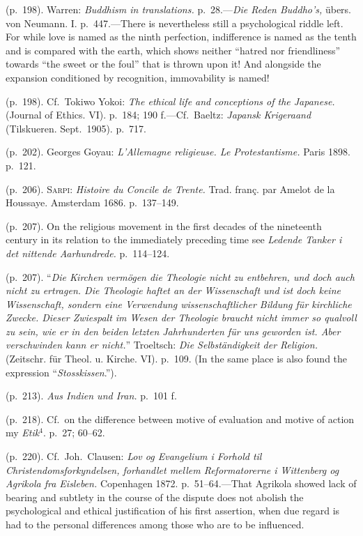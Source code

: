 \documentclass[12pt,a4paper]{book}
\newcommand{\opage}[1]{\marginnote{\footnotesize\textit{[#1]}}}
\begin{document}
 (p.~198). Warren: \emph{Buddhism in translations.} p.~28.---\emph{Die Reden Buddho's,} übers. von
Neumann. I. p.~447.---There is nevertheless still a psychological riddle left. For while love is named
as the ninth perfection, indifference is named as the tenth and is compared with the earth, which shows
neither ``hatred nor friendliness'' towards ``the sweet or the foul'' that is thrown upon it! And
alongside the expansion conditioned by recognition, immovability is named!

 (p.~198). Cf.\ Tokiwo Yokoi: \emph{The ethical life and conceptions of the Japanese.} (Journal of
Ethics. VI). p.~184; 190 f.---Cf.\ Baeltz: \emph{Japansk Krigeraand} (Tilskueren. Sept.\ 1905). p.~717.

 (p.~202). Georges Goyau: \emph{L'Allemagne religieuse. Le Protestantisme.} Paris 1898. p.~121.

 (p.~206). \textsc{Sarpi}: \emph{Histoire du Concile de Trente.} Trad. franç. par Amelot de la Houssaye.
Amsterdam 1686. p.~137--149.

\opage{255}(p.~207). On the religious movement in the first decades of the nineteenth century in its relation to
the immediately preceding time see \emph{Ledende Tanker i det nittende Aarhundrede.} p.~114--124.

 (p.~207). ``\emph{Die Kirchen vermögen die Theologie nicht zu entbehren, und doch auch nicht zu
ertragen. Die Theologie haftet an der Wissenschaft und ist doch keine Wissenschaft, sondern eine
Verwendung wissenschaftlicher Bildung für kirchliche Zwecke. Dieser Zwiespalt im Wesen der Theologie
braucht nicht immer so qualvoll zu sein, wie er in den beiden letzten Jahrhunderten für uns geworden
ist. Aber verschwinden kann er nicht.}'' Troeltsch: \emph{Die Selbständigkeit der Religion.} (Zeitschr.
für Theol. u. Kirche. VI). p.~109. (In the same place is also found the expression
``\emph{Stosskissen}.'').

 (p.~213). \emph{Aus Indien und Iran.} p.~101 f.

 (p.~218). Cf.\ on the difference between motive of evaluation and motive of action my \emph{Etik}$^4$.
p.~27; 60--62.

 (p.~220). Cf.\ Joh.\ Clausen: \emph{Lov og Evangelium i Forhold til Christendomsforkyndelsen,
forhandlet mellem Reformatorerne i Wittenberg og Agrikola fra Eisleben.} Copenhagen 1872.
p.~51--64.---That Agrikola showed lack of bearing and subtlety in the course of the dispute does not
abolish the psychological and ethical justification of his first assertion, when due regard is had to the
personal differences among those who are to be influenced.
\end{document}
